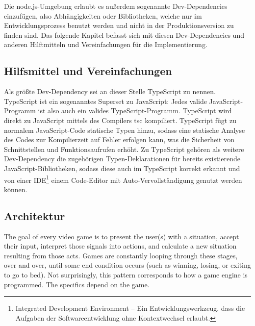 Die node.js-Umgebung erlaubt es außerdem sogenannte Dev-Dependencies einzufügen, also Abhängigkeiten oder Bibliotheken, welche nur im Entwicklungsprozess benutzt werden und nicht in der Produktionsversion zu finden sind. Das folgende Kapitel befasst sich mit diesen Dev-Dependencies und anderen Hilftmitteln und Vereinfachungen für die Implementierung.
\subsection{Hilfsmittel und Vereinfachungen}
\label{subsec:Hilfsmittel}
Als größte Dev-Dependency sei an dieser Stelle TypeScript zu nennen. TypeScript ist ein sogenanntes Superset zu JavaScript: Jedes valide JavaScript-Programm ist also auch ein valides TypeScript-Programm. TypeScript wird direkt zu JavaScript mittels des Compilers tsc kompiliert. TypeScript fügt zu normalem JavaScript-Code statische Typen hinzu, sodass eine statische Analyse des Codes zur Kompilierzeit auf Fehler erfolgen kann, was die Sicherheit von Schnittstellen und Funktionsaufrufen erhöht. Zu TypeScript gehören als weitere Dev-Dependency die zugehörigen Typen-Deklarationen für bereits existierende JavaScript-Bibliotheken, sodass diese auch im TypeScript korrekt erkannt und von einer IDE\footnote{Integrated Development Environment -- Ein Entwicklungswerkzeug, dass die Aufgaben der Softwareentwicklung ohne Kontextwechsel erlaubt.} \bzw einem Code-Editor mit Auto-Vervollständigung genutzt werden können.

\subsection{Architektur}
\label{subsec:Architektur}
The goal of every video game is to present the user(s) with a situation, accept their input, interpret those signals into actions, and calculate a new situation resulting from those acts. Games are constantly looping through these stages, over and over, until some end condition occurs (such as winning, losing, or exiting to go to bed). Not surprisingly, this pattern corresponds to how a game engine is programmed. The specifics depend on the game. \cite{https://developer.mozilla.org/en-us/docs/games/anatomy}

